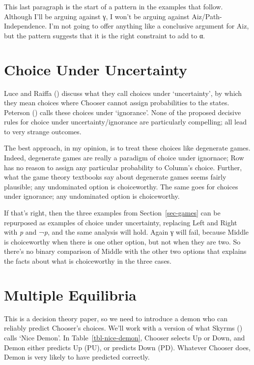 \documentclass[
  11pt,
  letterpaper,
  DIV=11,
  numbers=noendperiod,
  twoside]{scrartcl}
\begin{document}
This last paragraph is the start of a pattern in the examples that
follow. Although I'll be arguing against γ, I won't be arguing against
Aiz/Path-Independence. I'm not going to offer anything like a conclusive
argument for Aiz, but the pattern suggests that it is the right
constraint to add to α.

\section{Choice Under Uncertainty}\label{sec-uncertainty}

Luce and Raiffa () discuss what they
call choices under `uncertainty', by which they mean choices where
Chooser cannot assign probabilities to the states. Peterson
() calls these choices under
`ignorance'. None of the proposed decisive rules for choice under
uncertainty/ignorance are particularly compelling; all lead to very
strange outcomes.

The best approach, in my opinion, is to treat these choices like
degenerate games. Indeed, degenerate games are really a paradigm of
choice under ignornace; Row has no reason to assign any particular
probability to Column's choice. Further, what the game theory textbooks
say about degenerate games seems fairly plausible; any undominated
option is choiceworthy. The same goes for choices under ignorance; any
undominated option is choiceworthy.

If that's right, then the three examples from Section~\ref{sec-games}
can be repurposed as examples of choice under uncertainty, replacing
Left and Right with \emph{p} and ¬\emph{p}, and the same analysis will
hold. Again γ will fail, because Middle is choiceworthy when there is
one other option, but not when they are two. So there's no binary
comparison of Middle with the other two options that explains the facts
about what is choiceworthy in the three cases.

\section{Multiple Equilibria}\label{sec-multieq}

This is a decision theory paper, so we need to introduce a demon who can
reliably predict Chooser's choices. We'll work with a version of what
Skyrms () calls `Nice Demon'. In
Table~\ref{tbl-nice-demon}, Chooser selects Up or Down, and Demon either
predicts Up (PU), or predicts Down (PD). Whatever Chooser does, Demon is
very likely to have predicted correctly.
\end{document}
